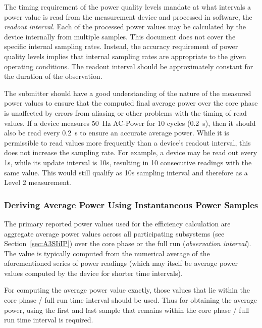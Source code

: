 The timing requirement of the power quality levels mandate at what intervals a power value is read from the measurement device and processed in software, the \emph{readout interval}.
Each of the processed power values may be calculated by the device internally from multiple samples.
This document does not cover the specific internal sampling rates.
Instead, the accuracy requirement of power quality levels implies that internal sampling rates are appropriate to the given operating conditions. %
The readout interval should be approximately constant for the duration of the observation.%

The submitter should have a good understanding of the nature of the measured power values to ensure that the computed final average power over the core phase is unaffected by errors from aliasing or other problems with the timing of read values.
If a device measures \SI{50}{\hertz} AC-Power for \num{10} cycles (\SI{0.2}{\second}), then it should also be read every \SI{0.2}{\second} to ensure an accurate average power.
While it is permissible to read values more frequently than a device's readout interval, this does not increase the sampling rate.
For example, a device may be read out every 1s, while its update interval is 10s, resulting in 10 consecutive readings with the same value.
This would still qualify as 10s sampling interval and therefore as a Level 2 measurement.

\subsubsection{Deriving Average Power Using Instantaneous Power Samples}

The primary reported power values used for the efficiency calculation are aggregate average power values across all participating subsystems (see Section~\ref{sec:A3SIiIP}) over the core phase or the full run (\emph{observation interval}).
The value is typically computed from the numerical average of the aforementioned series of power readings (which may itself be average power values computed by the device for shorter time intervals).

For computing the average power value exactly, those values that lie within the core phase / full run time interval should be used.
Thus for obtaining the average power, using the first and last sample that remains within the core phase / full run time interval is required.



